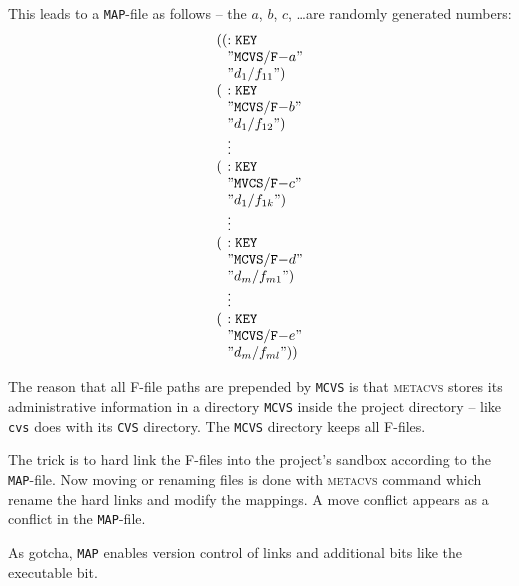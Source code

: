 \documentclass[fleqn, 10pt, a4paper]{article}
\begin{document}
This leads to a \texttt{MAP}-file as follows -- the $a$, $b$, $c$,
\ldots are randomly generated numbers:
\begin{displaymath}
\begin{array}{l@{}l}
\mathtt{((} & \mathtt{:KEY} \\
            & \mathtt{"MCVS/F-}a \mathtt{"} \\
            & \mathtt{"}d_1/f_{11}\mathtt{")} \\
\mathtt{(}  & \mathtt{:KEY} \\
            & \mathtt{"MCVS/F-}b \mathtt{"} \\
            & \mathtt{"}d_1/f_{12}\mathtt{")} \\
            & \vdots \\
\mathtt{(}  & \mathtt{:KEY} \\
            & \mathtt{"MVCS/F-}c \mathtt{"} \\
            & \mathtt{"}d_1/f_{1k}\mathtt{")} \\
            & \vdots \\
\mathtt{(}  & \mathtt{:KEY} \\
            & \mathtt{"MCVS/F-}d \mathtt{"} \\
            & \mathtt{"}d_m/f_{m1}\mathtt{")} \\
	    & \vdots \\
\mathtt{(}  & \mathtt{:KEY} \\
            & \mathtt{"MCVS/F-}e \mathtt{"} \\
            & \mathtt{"}d_m/f_{ml}\mathtt{"))} \\
\end{array}
\end{displaymath}

The reason that all F-file paths are prepended by
\texttt{MCVS} is that \textsc{metacvs} stores its
administrative information in a directory \texttt{MCVS}
inside the project directory -- like \texttt{cvs} does
with its \texttt{CVS} directory. The \texttt{MCVS}
directory keeps all F-files.

The trick is to hard link the F-files into the project's
sandbox according to the \texttt{MAP}-file. Now moving or
renaming files is done with \textsc{metacvs} command which
rename the hard links and modify the mappings. A move conflict
appears as a conflict in the \texttt{MAP}-file.

As gotcha, \texttt{MAP} enables version control of links and
additional bits like the executable bit.
\end{document}

